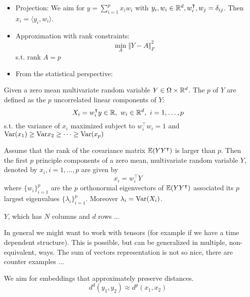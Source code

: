 \begin{itemize}
    \item Projection: We aim for $y=\sum_{i=1}^p x_i w_i$ with $y_i,w_i\in\mathbb{R}^d, w_i^\intercal,w_j=\delta_{ij}$. Then $x_i=\langle y_i,w_i\rangle$.
    \item Approximation with rank constraints:\[\min_{A}\Vert Y-A\Vert_{F}^2\] s.t. rank $A=p$
    \item From the statistical perspective: 
\end{itemize}

\begin{definition}\label{def:2.2}
    Given a zero mean multivariate random variable $Y\in\Omega\times \mathbb{R}^d$. The $p$  of $Y$
    are defined as the $p$ uncorrelated linear components of $Y$:\[X_i=w_i^\intercal y\in\mathbb{R},\text{ } w_i\in\mathbb{R}^d,\text{ }i=1,\dots,p\] s.t. the variance of $x_i$ maximized subject to $w_i^\intercal w_i=1$  and $\text{Var}(x_1)\geq \text{Var}{x_2}\geq\dots\geq \text{Var}(x_p)$
\end{definition}

\begin{theorem}\label{thm:2.3}
    Assume that the rank of the covariance matrix $\mathbb{E}(YY^\intercal)$ is larger than $p$. Then the first 
    $p$ principle components of a zero mean, multivariate random variable $Y$, denoted by $x_i,i=1,\dots,p$ are given by 
    \[x_i=w_i^\intercal Y\]
    where $\{w_i\}_{i=1}^p$ are the $p$ orthonormal eigenvectors of $\mathbb{E}(YY^\intercal)$ associated 
    its $p$ largest eigenvalues $\{\lambda_i\}_{i=1}^p$. Moreover $\lambda_i=\text{Var}(X_i)$.
\end{theorem}

\begin{aremark}
    $Y$, which has $N$ columns and $d$ rows ... %
\end{aremark}

\begin{aremark}
    In general we might want to work with tensors (for example if we have a time dependent structure). This is possible, but can be generalized 
    in multiple, non-equivalent, ways. The sum of vectors representation is not so nice, there are counter examples ... 
\end{aremark}

We aim for embeddings that approximately preserve distances. 
\[d^d(y_1,y_2)\approx d^p(x_1,x_2)\]

